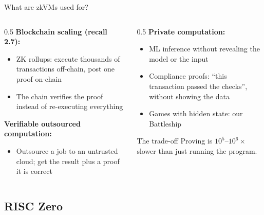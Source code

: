 \ifdefined\PRESENTATION\else\PassOptionsToClass{handout}{beamer}\fi\documentclass[aspectratio=169, lualatex]{beamer}
\begin{document}
\begin{frame}{What are zkVMs used for?}
	\begin{columns}[c]
		\begin{column}{0.5\textwidth}
			\textbf{Blockchain scaling (recall 2.7):}
			\begin{itemize}
				\item ZK rollups: execute thousands of transactions off-chain, post one proof on-chain
				\item The chain verifies the proof instead of re-executing everything
			\end{itemize}
			\textbf{Verifiable outsourced computation:}
			\begin{itemize}
				\item Outsource a job to an untrusted cloud; get the result plus a proof it is correct
			\end{itemize}
		\end{column}
		\begin{column}{0.5\textwidth}
			\textbf{Private computation:}
			\begin{itemize}
				\item ML inference without revealing the model or the input
				\item Compliance proofs: ``this transaction passed the checks'', without showing the data
				\item Games with hidden state: our Battleship
			\end{itemize}
			\begin{alertblock}{The trade-off}
				Proving is $10^5$--$10^6\times$ slower than just running the program.
			\end{alertblock}
		\end{column}
	\end{columns}
\end{frame}

\subsection{RISC Zero}
\end{document}
